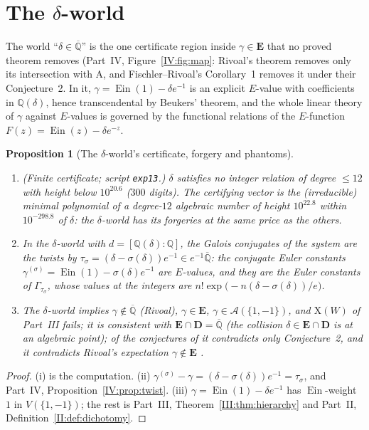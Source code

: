 \documentclass[11pt,a4paper]{article}
\newcommand{\Q}{\mathbb Q}
\newcommand{\Qbar}{\overline{\mathbb Q}}
\newcommand{\Ein}{\operatorname{Ein}}
\newcommand{\EE}{\mathbf E}
\newcommand{\DD}{\mathbf D}
\newcommand{\Aff}{\mathcal A}
\newtheorem{proposition}[theorem]{Proposition}
\theoremstyle{definition}
\theoremstyle{remark}
\numberwithin{equation}{section}
\begin{document}
\section{The $\delta$-world}\label{V:sec:delta}

The world ``$\delta\in\Qbar$'' is the one certificate region inside $\gamma\in\EE$ that no
proved theorem removes (Part~IV, Figure~\ref{IV:fig:map}: Rivoal's theorem removes only its intersection
with $\mathrm A$, and Fischler--Rivoal's Corollary~1 removes it under their Conjecture~2.
In it, $\gamma=\Ein(1)-\delta e^{-1}$ is an explicit $E$-value with coefficients in
$\Q(\delta)$, hence transcendental by Beukers' theorem, and the whole linear theory of
$\gamma$ against $E$-values is governed by the functional relations of the $E$-function
$F(z)=\Ein(z)-\delta e^{-z}$.

\begin{proposition}[The $\delta$-world's certificate, forgery and phantoms]\label{V:prop:delta}
\begin{enumerate}[label=(\roman*)]
\item \textup{(Finite certificate; script \texttt{exp13}.)} $\delta$ satisfies no integer
relation of degree $\le12$ with height below $10^{20.6}$ ($300$ digits). The certifying
vector is the (irreducible) minimal polynomial of a degree-$12$ algebraic number of height
$10^{22.8}$ within $10^{-298.8}$ of $\delta$: the $\delta$-world has its forgeries at the
same price as the others.
\item In the $\delta$-world with $d=[\Q(\delta):\Q]$, the Galois conjugates of the system
are the twists by $\tau_\sigma=(\delta-\sigma(\delta))e^{-1}\in e^{-1}\Qbar$: the conjugate
Euler constants $\gamma^{(\sigma)}=\Ein(1)-\sigma(\delta)e^{-1}$ are $E$-values, and they are
the Euler constants of $\Gamma_{\tau_\sigma}$, whose values at the integers are
$n!\exp\bigl(-n(\delta-\sigma(\delta))/e\bigr)$.
\item The $\delta$-world implies $\gamma\notin\Qbar$ (Rivoal), $\gamma\in\EE$,
$\gamma\in\Aff(\{1,-1\})$, and $\mathrm X(W)$ of Part~III fails; it is consistent with
$\EE\cap\DD=\Qbar$ (the collision $\delta\in\EE\cap\DD$ is at an algebraic point); of the
conjectures of \cite{FRmixed} it contradicts only Conjecture~2, and it contradicts Rivoal's
expectation $\gamma\notin\EE$ \cite{Rivoal2017}.
\end{enumerate}
\end{proposition}
\begin{proof}
(i) is the computation. (ii) $\gamma^{(\sigma)}-\gamma=(\delta-\sigma(\delta))e^{-1}=\tau_\sigma$,
and Part~IV, Proposition~\ref{IV:prop:twist}. (iii) $\gamma=\Ein(1)-\delta e^{-1}$ has $\Ein$-weight $1$ in
$V(\{1,-1\})$; the rest is Part~III, Theorem~\ref{III:thm:hierarchy} and Part~II, Definition~\ref{II:def:dichotomy}.
\end{proof}
\end{document}
